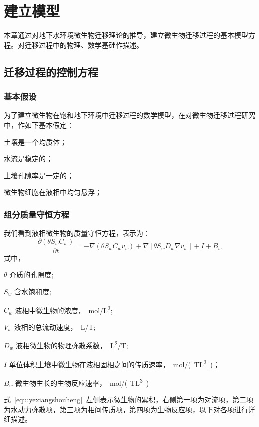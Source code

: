 \chapter{建立模型}
本章通过对地下水环境微生物迁移理论的推导，建立微生物迁移过程的基本模型方程。对迁移过程中的物理、数学基础作描述。
\section{迁移过程的控制方程}
\subsection{基本假设}
为了建立微生物在饱和地下环境中迁移过程的数学模型，在对微生物迁移过程研究中，作如下基本假定：
\begin{asparaenum}[(1)]
\item 土壤是一个均质体； 
\item 水流是稳定的； 
\item 土壤孔隙率是一定的； 
\item 微生物细胞在液相中均匀悬浮； 
\end{asparaenum}\par
\subsection{组分质量守恒方程}
我们看到液相微生物的质量守恒方程，表示为：
\begin{equation}\label{equ:yexiangshouheng}
\dfrac{\partial(\theta S_w C_w)}{\partial t}
=-\nabla(\theta S_w C_w v_w)+\nabla[\theta S_wD_w\nabla v_w]+I+B_w
\end{equation}
式中，
\begin{asparadesc}
	\item[$\theta$]介质的孔隙度;
	\item[$S_w$]含水饱和度;
	\item[$C_w$]液相中微生物的浓度，\SI{}{mol/L^3};
	\item[$V_w$]液相的总流动速度，\SI{}{L/T};
	\item[$D_w$]液相微生物的物理弥散系数，\SI{}{L^2/T};
	\item[$I$]单位体积土壤中微生物在液相固相之间的传质速率，\SI{}{mol/(TL^3)}；
	\item[$B_w$]微生物生长的生物反应速率，\SI{}{mol/(TL^3)}
\end{asparadesc}
式~\eqref{equ:yexiangshouheng}~左侧表示微生物的累积，右侧第一项为对流项，第二项为水动力弥散项，第三项为相间传质项，第四项为生物反应项，以下对各项进行详细描述。
